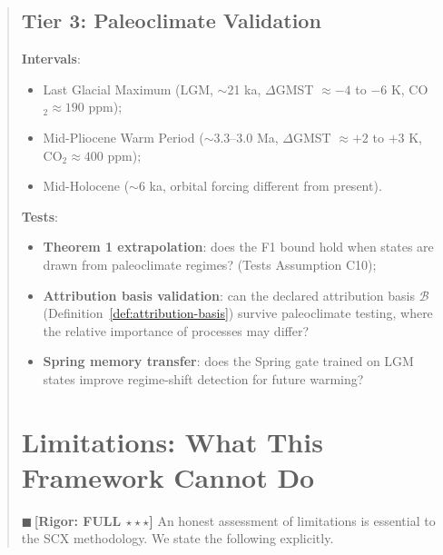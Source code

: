 \documentclass[11pt,a4paper]{article}
\theoremstyle{plain}
\theoremstyle{definition}
\theoremstyle{remark}
\newcommand{\rigorFull}{{\color{rigorFull}$\blacksquare$\,\textbf{[Rigor: FULL $\star\star\star$]}}}
\begin{document}
\begin{abstract}
\subsection{Tier 3: Paleoclimate Validation}
\textbf{Intervals}:
\begin{itemize}[nosep]
  \item Last Glacial Maximum (LGM, $\sim$21 ka, $\Delta$GMST $\approx -4$ to $-6$ K,
    CO$_2 \approx 190$ ppm);
  \item Mid-Pliocene Warm Period ($\sim$3.3--3.0 Ma, $\Delta$GMST $\approx +2$ to $+3$ K,
    CO$_2 \approx 400$ ppm);
  \item Mid-Holocene ($\sim$6 ka, orbital forcing different from present).
\end{itemize}
\textbf{Tests}:
\begin{itemize}[nosep]
  \item \textbf{Theorem 1 extrapolation}: does the F1 bound hold when states
    are drawn from paleoclimate regimes? (Tests Assumption C10);
  \item \textbf{Attribution basis validation}: can the declared attribution
    basis $\mathcal{B}$ (Definition~\ref{def:attribution-basis}) survive
    paleoclimate testing, where the relative importance of processes may differ?
  \item \textbf{Spring memory transfer}: does the Spring gate trained on LGM
    states improve regime-shift detection for future warming?
\end{itemize}
\section{Limitations: What This Framework Cannot Do}
\label{sec:limitations}
\rigorFull
An honest assessment of limitations is essential to the SCX methodology. We
state the following explicitly.

\end{abstract}
\end{document}
